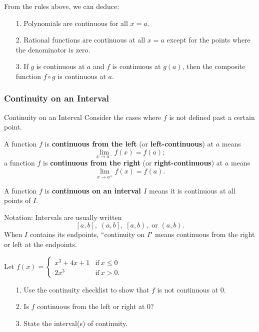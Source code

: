 \documentclass[Cal1Spr16Lectures.tex]{subfiles}
\begin{document}
\begin{frame}
From the rules above, we can deduce:
\begin{itemize}
\item[1.] Polynomials are continuous for all $x=a$.
\item[2.] Rational functions are continuous at all $x=a$ except for the points where the denominator is zero.  
\item[3.] If $g$ is continuous at $a$ and $f$ is continuous at $g(a)$, then the composite function $f \circ g$ is continuous at $a$.
\end{itemize}
\end{frame}

\subsubsection{Continuity on an Interval}

\begin{frame}{\small Continuity on an Interval}\footnotesize 
Consider the cases where $f$ is not defined past a certain point. 
\begin{dfn}
A function $f$ is {\bf continuous from the left} (or {\bf left-continuous}) at $a$ means
\[\lim_{x \to a^-} f(x)=f(a);\]
a function $f$ is {\bf continuous from the right} (or {\bf right-continuous}) at $a$ means
\[\lim_{x \to a^+} f(x)=f(a).\]
\end{dfn}
\end{frame}

\begin{frame}
\begin{dfn} A function $f$ is {\bf continuous on an interval $I$} means it is continuous at all points of $I$. \end{dfn}  
Notation: Intervals are usually written 
\[\left[a,b\right],\;\left(a,b\right],\;\left[a,b\right),\text{ or }\left(a,b\right).\]
When $I$ contains its endpoints, ``continuity on $I$" means continuous from the right or left at the endpoints.
\end{frame}

\begin{frame}
\begin{ex}Let $f(x)=\begin{cases}
	x^3+4x+1 & \text{if}\ x \leq 0 \\
	2x^3 & \text{if}\ x>0.
	\end{cases}$
\begin{itemize}
\item[1.] Use the continuity checklist to show that $f$ is not continuous at 0.
\item[2.] Is $f$ continuous from the left or right at 0?
\item[3.] State the interval(s) of continuity.
\end{itemize}
\end{ex}
\end{frame}
\end{document}
